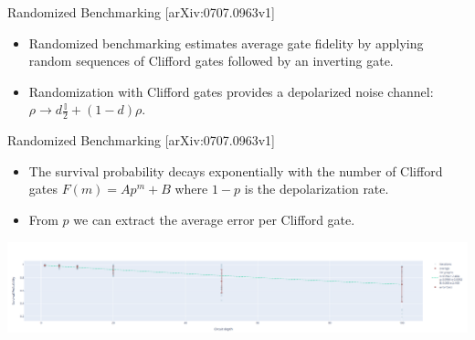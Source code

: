 \documentclass[aspectratio=169,10pt]{beamer}
\begin{document}
\begin{frame}[t,fragile]{Randomized Benchmarking \hfill{\small[arXiv:0707.0963v1]}}

  \begin{itemize}
    \item<1-> Randomized benchmarking estimates average gate fidelity by applying random sequences of Clifford gates followed by an inverting gate.
    \item<2-> Randomization with Clifford gates provides a depolarized noise channel: $\rho \rightarrow d \frac{\mathbb{I}}{2} + (1-d)\rho$.
  \end{itemize}

  \vspace{3mm}
\end{frame}

\begin{frame}[t,fragile]{Randomized Benchmarking \hfill{\small[arXiv:0707.0963v1]}}
  \begin{itemize}
    \item<1-> The survival probability decays exponentially with the number of Clifford gates $F(m) = Ap^m + B$ where $1-p$ is the depolarization rate.\\
    \item<2-> From $p$ we can extract the average error per Clifford gate.\\
  \end{itemize}

  \begin{center}
    \vspace{0.5em}
    \includegraphics[width=\textwidth]{figures/rb.png}\\
    \vspace{1.25em}
  \end{center}
\end{frame}
\end{document}
